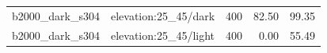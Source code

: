 \begin{longtable}{l>{\raggedright\arraybackslash}p{.42\linewidth}rrr}
b2000\_\allowbreak{}dark\_\allowbreak{}s304 & %
elevation:25\_\allowbreak{}45/dark & %
400 & %
82.50 & %
99.35 \\ %

b2000\_\allowbreak{}dark\_\allowbreak{}s304 & %
elevation:25\_\allowbreak{}45/light & %
400 & %
0.00 & %
55.49 \\ %


\end{longtable}
